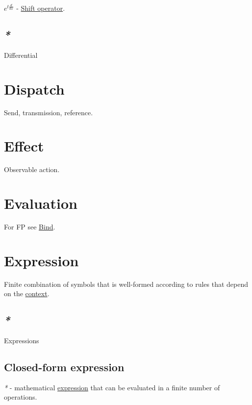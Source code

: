 \documentclass[a4paper,14pt,oneside]{book}
\begin{document}
\(e^{t{\frac{d}{dx}}}\) - \hyperref[org5f3fc94]{Shift operator}.\\

\section{\emph{*}}
\label{sec:org3f5ed30}

\label{org6e8a285}Differential\\

\chapter{\label{org95dc16e}Dispatch}
\label{sec:org78447f8}
Send, transmission, reference.\\

\chapter{\label{orgfb5f966}Effect}
\label{sec:org2bf8cfa}
Observable action.\\

\chapter{\label{org484cace}Evaluation}
\label{sec:orgb7d7f4c}
For FP see \hyperref[orgec29b54]{Bind}.\\

\chapter{\label{orgade06d7}Expression}
\label{sec:orgde5bc10}
Finite combination of symbols that is well-formed according to rules that depend on the \hyperref[orga970b48]{context}.\\

\section{\emph{*}}
\label{sec:org3fbb81e}

\label{org907bfe3}Expressions\\

\section{\label{orgfd2cb97}Closed-form expression}
\label{sec:org44c15d6}
\emph{*} - mathematical \hyperref[orgade06d7]{expression} that can be evaluated in a finite number of operations.\\
\end{document}
